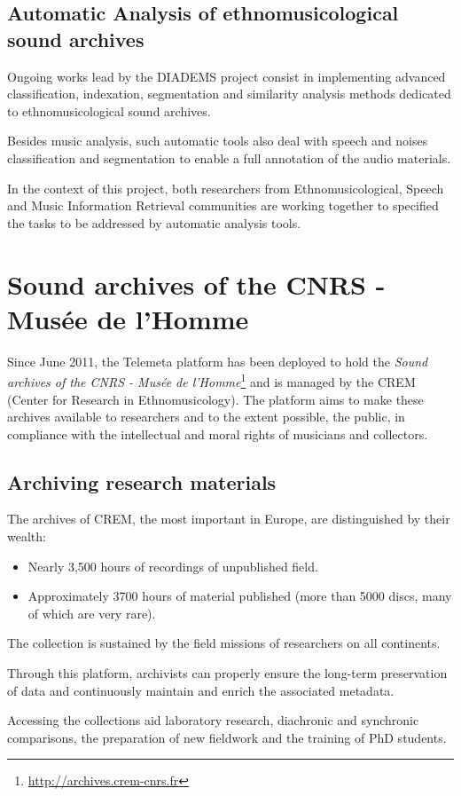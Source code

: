 \documentclass{paper}
\begin{document}
\subsection{Automatic Analysis of ethnomusicological sound archives}
Ongoing works lead by the DIADEMS project consist in implementing advanced classification, indexation, segmentation and  similarity analysis methods dedicated to ethnomusicological sound archives.

Besides music analysis, such automatic tools also deal with speech and noises classification and segmentation to enable a full annotation of the audio materials.

In the context of this project, both researchers from Ethnomusicological, Speech and Music Information Retrieval communities are working together to specified the tasks to be addressed by automatic analysis tools.

\section{Sound archives of the CNRS - Musée de l'Homme}\label{sec:archives-CREM}
Since June 2011, the Telemeta platform has been deployed to hold the \emph{Sound archives of the CNRS - Musée de l'Homme}\footnote{\url{http://archives.crem-cnrs.fr}} and is managed by the CREM (Center for Research in Ethnomusicology).
The platform aims to make these archives available to researchers and to the extent possible, the public, in compliance with the intellectual and moral rights of musicians and collectors.

\subsection{Archiving research materials}
The archives of CREM, the most important in Europe, are distinguished by their wealth:
\begin{itemize}
\item Nearly 3,500 hours of recordings of unpublished field.
\item Approximately 3700 hours of material published (more than 5000 discs, many of which are very rare).
\end{itemize}
The collection is sustained by the field missions of researchers on all continents. 

Through this platform, archivists can properly ensure the long-term preservation of data and continuously maintain and enrich the associated metadata.

Accessing the collections aid laboratory research, diachronic and synchronic comparisons, the preparation of new fieldwork and the training of PhD students.
\end{document}
